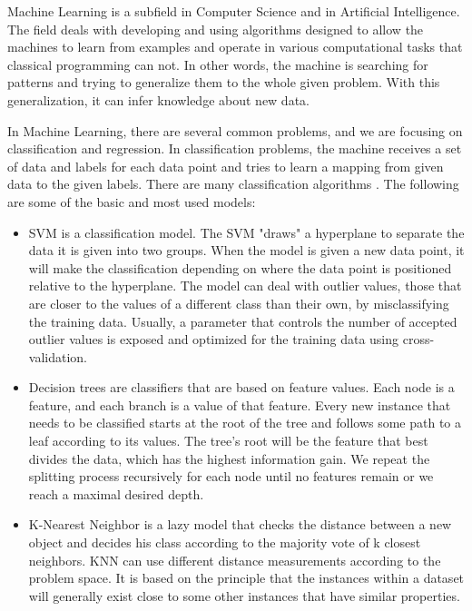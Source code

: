 \documentclass[../main.tex]{subfiles}
\begin{document}
Machine Learning is a subfield in Computer Science and in Artificial Intelligence. 
The field deals with developing and using algorithms designed to allow the machines to 
learn from examples and operate in various computational tasks that classical programming can not. 
In other words, the machine is searching for patterns and trying to generalize them to 
the whole given problem. With this generalization, it can infer knowledge about new data.
\par
 
In Machine Learning, there are several common problems, and we are focusing on classification 
and regression.
In classification problems, the machine receives a set of data and labels for each data point and 
tries to learn a mapping from given data to the given labels. 
There are many classification algorithms \cite{machine_learning_classification_algorithms}. The following are some of the basic and most 
used models:

\begin{samepage}
\begin{itemize}
    \item SVM is a classification model. The SVM "draws" a hyperplane to separate the data it is given into two groups.
        When the model is given a new data point, it will make the classification depending on where the data point is positioned
        relative to the hyperplane. The model can deal with outlier values, those that are closer to the values of a different class than their own,
        by misclassifying the training data. Usually, a parameter that controls the number of accepted outlier values is exposed and optimized for
        the training data using cross-validation.
    \item Decision trees are classifiers that are based on feature values. Each node is a feature, and each branch is a value of that feature.
        Every new instance that needs to be classified starts at the root of the tree and follows some path to a leaf according to its values.
        The tree's root will be the feature that best divides the data, which has the highest information gain.
        We repeat the splitting process recursively for each node until no features remain or we reach a maximal desired depth.
    \item K-Nearest Neighbor is a lazy model that checks the distance between a new object and decides his class according
        to the majority vote of k closest neighbors. KNN can use different distance measurements according to the problem space.
        It is based on the principle that the instances within a dataset will generally exist close to some other instances that have
        similar properties.
\end{itemize}
\end{samepage}
\end{document}
